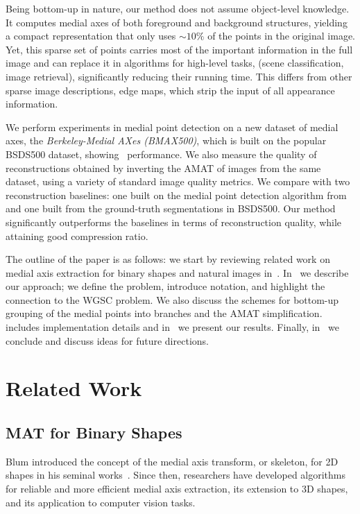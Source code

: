\documentclass[10pt,twocolumn,letterpaper]{article}
\begin{document}
Being bottom-up in nature, our method does not assume object-level knowledge.
It computes medial axes of both foreground and background structures, 
yielding a compact representation that only uses $\sim 10\%$ of the points in the original image.
Yet, this sparse set of points carries most of the important information in the full image
and can replace it in algorithms for high-level tasks, 
(scene classification, image retrieval), significantly reducing their running time.
This differs from other sparse image descriptions, \eg edge maps, which strip the input of all appearance information.

We perform experiments in medial point detection on a new dataset of medial axes, the 
\emph{Berkeley-Medial AXes (BMAX500)}, which is built on the popular BSDS500 dataset, showing \sota\ performance.
We also measure the quality of reconstructions  obtained by inverting the AMAT of images from the same dataset, 
using  a variety of standard image quality metrics.
We compare with two reconstruction baselines: one built on the medial point detection algorithm from~\cite{tsogkas2012learning}
and one built from the ground-truth segmentations in BSDS500.
Our method significantly outperforms the baselines in terms of reconstruction quality, while attaining good compression ratio.

The outline of the paper is as follows: we start by reviewing related work on medial axis extraction for binary shapes
and natural images in~.
In~ we describe our approach; we define the problem, introduce notation, and highlight the connection to
the WGSC problem.
We also discuss the schemes for bottom-up grouping of the medial points into branches and the AMAT simplification.
~ includes implementation details and in~ we present our results.
Finally, in~ we conclude and discuss ideas for future directions.


\section{Related Work}\label{sec:related}
\subsection{MAT for Binary Shapes}\label{sec:related:binary}
Blum introduced the concept of the medial axis transform, or skeleton, for 2D shapes
in his seminal works~\cite{blum1967transformation,blum1973biological}.
Since then, researchers have developed algorithms for reliable
and more efficient medial axis extraction, its extension to 3D shapes, and its application
to computer vision tasks.
\end{document}

